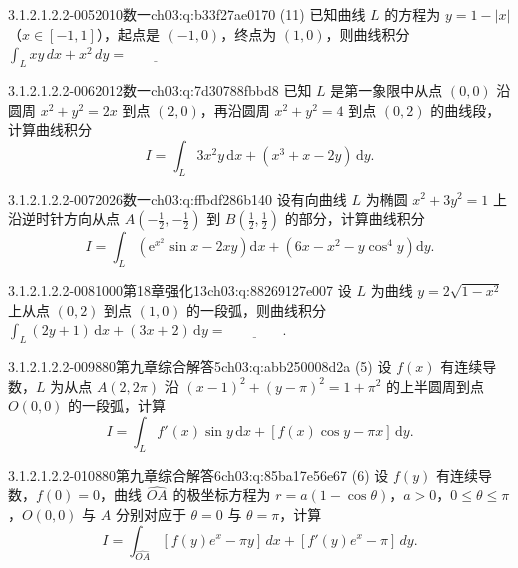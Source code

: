 \begin{q}{3.1.2.1.2.2-005}{2010数一}{ch03:q:b33f27ae0170}
(11) 已知曲线 $L$ 的方程为 $y=1-|x|$（$x\in[-1,1]$），起点是 $(-1,0)$，终点为 $(1,0)$，则曲线积分
$\displaystyle \int_L xy\,dx+x^2\,dy=\underline{\hspace{4em}}$
\end{q}

\begin{q}{3.1.2.1.2.2-006}{2012数一}{ch03:q:7d30788fbbd8}
已知 $L$ 是第一象限中从点 $(0,0)$ 沿圆周 $x^2+y^2=2x$ 到点 $(2,0)$，再沿圆周 $x^2+y^2=4$ 到点 $(0,2)$ 的曲线段，计算曲线积分
\[
I=\int_L 3x^2y\,\mathrm{d}x+(x^3+x-2y)\,\mathrm{d}y.
\]
\end{q}

\begin{q}{3.1.2.1.2.2-007}{2026数一}{ch03:q:ffbdf286b140}
设有向曲线 $L$ 为椭圆 $x^2+3y^2=1$ 上沿逆时针方向从点 $A\left(-\frac{1}{2},-\frac{1}{2}\right)$ 到 $B\left(\frac{1}{2},\frac{1}{2}\right)$ 的部分，计算曲线积分
\[ I=\int_L \left(\mathrm{e}^{x^2}\sin x-2xy\right)\mathrm{d}x+\left(6x-x^2-y\cos^4 y\right)\mathrm{d}y. \]
\end{q}

\begin{q}{3.1.2.1.2.2-008}{1000第18章强化13}{ch03:q:88269127e007}
设 $L$ 为曲线 $y=2\sqrt{1-x^2}$ 上从点 $(0,2)$ 到点 $(1,0)$ 的一段弧，则曲线积分 $\displaystyle\int_L (2y+1)\,\mathrm{d}x+(3x+2)\,\mathrm{d}y=\underline{\hspace{4em}}$.
\end{q}

\begin{q}{3.1.2.1.2.2-009}{880第九章综合解答5}{ch03:q:abb250008d2a}
(5) 设 $f(x)$ 有连续导数，$L$ 为从点 $A(2,2\pi)$ 沿 $(x-1)^2+(y-\pi)^2=1+\pi^2$ 的上半圆周到点 $O(0,0)$ 的一段弧，计算
\[ I=\int_L f'(x)\sin y\,\mathrm{d}x+[f(x)\cos y-\pi x]\,\mathrm{d}y. \]
\end{q}

\begin{q}{3.1.2.1.2.2-010}{880第九章综合解答6}{ch03:q:85ba17e56e67}
(6) 设 $f(y)$ 有连续导数，$f(0)=0$，曲线 $\widehat{OA}$ 的极坐标方程为 $r=a(1-\cos\theta)$，$a>0$，$0\leqslant \theta \leqslant \pi$，$O(0,0)$ 与 $A$ 分别对应于 $\theta=0$ 与 $\theta=\pi$，计算
\[
I=\int_{\widehat{OA}}[f(y)e^x-\pi y]\,dx+[f'(y)e^x-\pi]\,dy.
\]
\end{q}

